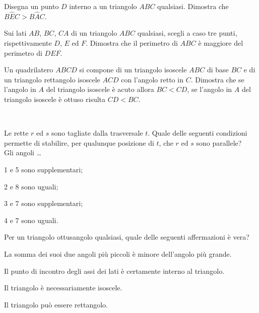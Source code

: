\begin{multicols}{2}
\begin{esercizio}
\label{ese:3.106}
Disegna un punto $D$ interno a un triangolo $ABC$ qualsiasi. Dimostra che $B\widehat{E}C>B\widehat{A}C$.
\end{esercizio}

\begin{esercizio}
\label{ese:3.107}
Sui lati $AB$, $BC$, $CA$ di un triangolo $ABC$ qualsiasi, scegli a caso tre punti, rispettivamente $D$, $E$ ed $F$. Dimostra che il perimetro di $ABC$ è maggiore del perimetro di $DEF$.
\end{esercizio}

\begin{esercizio}
\label{ese:3.108}
Un quadrilatero $ABCD$ si compone di un triangolo isoscele $ABC$ di base $BC$ e di un triangolo rettangolo isoscele $ACD$ con l'angolo retto in $C$. Dimostra che se l'angolo in $A$ del triangolo isoscele è acuto allora $BC<CD$, se l'angolo in $A$ del triangolo isoscele è ottuso risulta $CD<BC$.
\end{esercizio}

\end{multicols}

\begin{esercizio}
\label{ese:3.109}
~\\
\noindent\begin{minipage}{0.6\textwidth}
Le rette $r$ ed $s$ sono tagliate dalla trasversale $t$. Quale delle seguenti condizioni permette di stabilire, per qualunque posizione di $t$, che $r$ ed $s$ sono parallele?\\
Gli angoli \ldots{}
\begin{enumeratea}
\item 1 e 5 sono supplementari;
\item 2 e 8 sono uguali;
\item 3 e 7 sono supplementari;
\item 4 e 7 sono uguali.
\end{enumeratea}
\end{minipage}\hfil
\begin{minipage}{0.4\textwidth}
\centering
\end{minipage}
\end{esercizio}

\begin{esercizio}
\label{ese:3.110}
Per un triangolo ottusangolo qualsiasi, quale delle seguenti affermazioni è vera?
\begin{enumeratea}
\item La somma dei suoi due angoli più piccoli è minore dell'angolo più grande.
\item Il punto di incontro degli assi dei lati è certamente interno al triangolo.
\item Il triangolo è necessariamente isoscele.
\item Il triangolo può essere rettangolo.
\end{enumeratea}
\end{esercizio}

